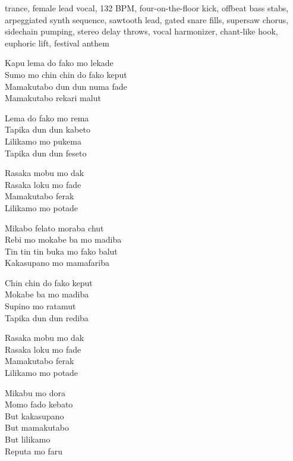 

\begin{notes}
\end{notes}
\begin{style}
trance, female lead vocal, 132 BPM, four-on-the-floor kick, offbeat bass stabs, arpeggiated synth sequence, sawtooth lead, gated snare fills, supersaw chorus, sidechain pumping, stereo delay throws, vocal harmonizer, chant-like hook, euphoric lift, festival anthem
\end{style}
\begin{lyrics}
Kapu lema do fako mo lekade\\
Sumo mo chin chin do fako keput\\
Mamakutabo dun dun numa fade\\
Mamakutabo rekari malut

Lema do fako mo rema\\
Tapika dun dun kabeto\\
Lilikamo mo pukema\\
Tapika dun dun feseto

Rasaka mobu mo dak\\
Rasaka loku mo fade\\
Mamakutabo ferak\\
Lilikamo mo potade

Mikabo felato moraba chut\\
Rebi mo mokabe ba mo madiba\\
Tin tin tin buka mo fako balut\\
Kakasupano mo mamafariba

Chin chin do fako keput\\
Mokabe ba mo madiba\\
Supino mo ratamut\\
Tapika dun dun rediba

Rasaka mobu mo dak\\
Rasaka loku mo fade\\
Mamakutabo ferak\\
Lilikamo mo potade

Mikabu mo dora\\
Momo fado kebato\\
But kakasupano\\
But mamakutabo\\
But lilikamo\\
Reputa mo faru


\end{lyrics}
